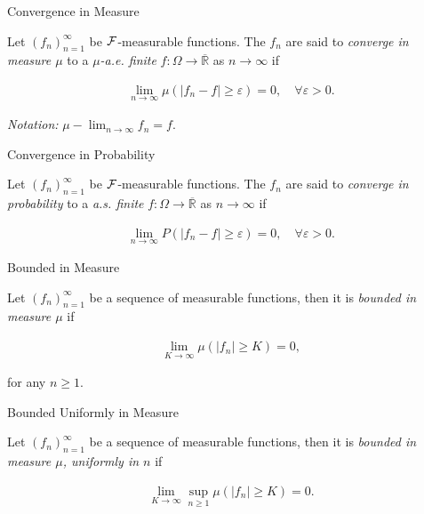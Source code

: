\begin{definition}{5.2}{Convergence in Measure}

    Let $(f_n)_{n=1}^{\infty}$ be $\mathcal{F}$-measurable functions. The $f_n$ are said to \emph{converge in measure $\mu$} to a \emph{$\mu$-a.e. finite} $f: \Omega \to \overline{\mathbb{R}}$ as $n \to \infty$ if

        \begin{align*}
            \lim_{n \to \infty} \mu(|f_n - f| \geq \varepsilon) = 0, \quad \forall \varepsilon > 0.
        \end{align*}

    \emph{Notation:} $\mu-\lim_{n \to \infty} f_n = f$.

\end{definition}

\begin{definition}{5.2}{Convergence in Probability}

    Let $(f_n)_{n=1}^{\infty}$ be $\mathcal{F}$-measurable functions. The $f_n$ are said to \emph{converge in probability} to a \emph{a.s. finite} $f: \Omega \to \overline{\mathbb{R}}$ as $n \to \infty$ if

        \begin{align*}
            \lim_{n \to \infty} P(|f_n - f| \geq \varepsilon) = 0, \quad \forall \varepsilon > 0.
        \end{align*}

\end{definition}

\begin{definition}{}{Bounded in Measure}

    Let $(f_n)_{n=1}^{\infty}$ be a sequence of measurable functions, then it is \emph{bounded in measure $\mu$} if

        \begin{align*}
            \lim_{K \to \infty} \mu(|f_n| \geq K) = 0,
        \end{align*}

    for any $n \geq 1$.

\end{definition}

\begin{definition}{}{Bounded Uniformly in Measure}

    Let $(f_n)_{n=1}^{\infty}$ be a sequence of measurable functions, then it is \emph{bounded in measure $\mu$, uniformly in $n$} if

        \begin{align*}
            \lim_{K \to \infty} \sup_{n \geq 1} \mu(|f_n| \geq K) = 0.
        \end{align*}

\end{definition}


